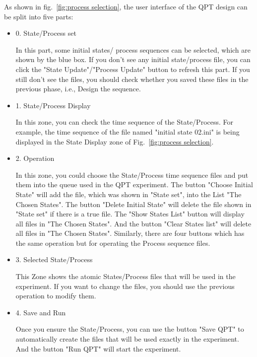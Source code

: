 \documentclass{article}
\begin{document}
As shown in fig.~\ref{fig:process selection}, the user interface of the QPT design can be split into five parts:
\begin{itemize}
    \item 0. State/Process set

    In this part, some initial states/ process sequences can be selected, which are shown by the blue box. If you don't see any initial state/process file, you can click the "State Update"/"Process Update" button to refresh this part. If you still don't see the files, you should check whether you saved these files in the previous phase, i.e., Design the sequence.  
    
    \item 1. State/Process Display

    In this zone, you can check the time sequence of the State/Process. For example, the time sequence of the file named "initial state 02.ini" is being displayed in the State Display zone of Fig.~\ref{fig:process selection}.      
    
    \item 2. Operation

    In this zone, you could choose the  State/Process time sequence files and put them into the queue used in the QPT experiment. The button "Choose Initial State" will add the file, which was shown in "State set", into the List "The Chosen States". The button "Delete Initial State" will delete the file shown in "State set" if there is a true file. The "Show States List" button will display all files in "The Chosen States". And the button "Clear States list" will delete all files in "The Chosen States". Similarly, there are four buttons which has the same operation but for operating the Process sequence files.  
    
    \item 3. Selected State/Process

    This Zone shows the atomic States/Process files that will be used in the experiment. If you want to change the files, you should use the previous operation to modify them.
    
    \item 4. Save and Run

    Once you ensure the State/Process, you can use the button "Save QPT" to automatically create the files that will be used exactly in the experiment. And the button "Run QPT" will start the experiment. 
    
\end{itemize}
\end{document}
